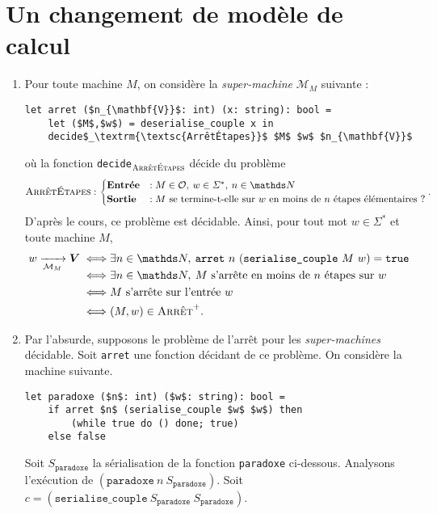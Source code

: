 \section{Un changement de modèle de calcul}

\begin{enumerate}
	\item Pour toute machine $M$, on considère la \textit{super-machine} $\mathcal{M}_M$\/ suivante :
		\begin{lstlisting}[language=caml,caption=\textit{Super-machine} résolvant le problème de l'\textsc{Arrêt} sur une machine classique,mathescape]
let arret ($n_{\mathbf{V}}$: int) (x: string): bool =
	let ($M$,$w$) = deserialise_couple x in
	decide$_\textrm{\textsc{ArrêtÉtapes}}$ $M$ $w$ $n_{\mathbf{V}}$
		\end{lstlisting}
		où la fonction \texttt{decide}$_{\textsc{ArrêtÉtapes}}$ décide du problème \[
			\textsc{ArrêtÉtapes} : \begin{cases}
				\text{\textbf{Entrée}} &: M \in \mathscr{O},\: w \in \Sigma^*,\:n \in \N\\
				\text{\textbf{Sortie}}&: M \text{ se termine-t-elle sur } w \text{ en moins de } n \text{ étapes élémentaires ?}
			\end{cases}
		.\] D'après le cours, ce problème est décidable. Ainsi, pour tout mot $w \in \Sigma^*$\/ et toute machine $M$,
		\begin{align*}
			\smash{w \xrightarrow[\mathcal{M}_M]{} \mathbf{V}} \iff&\exists n \in \N,\: \texttt{arret}\ n\ (\texttt{serialise\_couple}\ M\ w) = \texttt{true}\\
			\iff& \exists n \in \N,\: M \text{ s'arrête en moins de } n \text{ étapes sur } w \\
			\iff& M \text{ s'arrête sur l'entrée } w \\
			\iff& (M, w) \in \textsc{Arrêt}^+.
		\end{align*}
	\item Par l'absurde, supposons le problème de l'arrêt pour les \textit{super-machines} décidable. Soit \texttt{arret} une fonction décidant de ce problème. On considère la machine suivante.
		\begin{lstlisting}[language=caml,caption=Programme paradoxe proubant que le problème de l'arrêt des \textit{super-machines} est indécidable,mathescape]
let paradoxe ($n$: int) ($w$: string): bool =
	if arret $n$ (serialise_couple $w$ $w$) then
		(while true do () done; true)
	else false
		\end{lstlisting}
		Soit $S_{\texttt{paradoxe}}$\/ la sérialisation de la fonction \texttt{paradoxe} ci-dessous.
		Analysons l'exécution de $(\texttt{paradoxe}\ n\ S_{\texttt{paradoxe}})$. Soit $c = (\texttt{serialise\_couple}\ S_{\texttt{paradoxe}}\ S_{\texttt{paradoxe}})$.
\end{enumerate}
